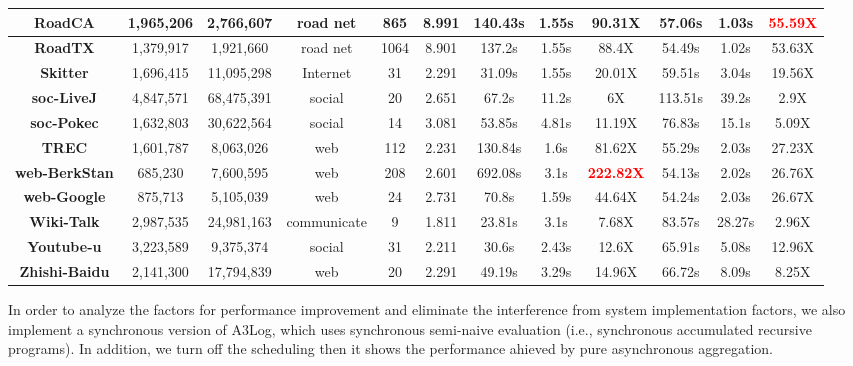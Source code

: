 \begin{table}[!t]
\begin{tabular}{c|c|c|c|c|c|c|c|c|c|c|c}
		\hline
		\textbf{RoadCA} & 1,965,206 & 2,766,607 & road net & 865 & 8.991 & 140.43s & 1.55s & 90.31X & 57.06s & 1.03s & \textcolor{red}{\textbf{55.59X}} \\
		\hline
		\textbf{RoadTX} & 1,379,917 & 1,921,660 & road net & 1064 & 8.901 & 137.2s & 1.55s & 88.4X & 54.49s & 1.02s & 53.63X \\
		\hline
		\textbf{Skitter} & 1,696,415 & 11,095,298 & Internet & 31 & 2.291 & 31.09s & 1.55s & 20.01X & 59.51s & 3.04s & 19.56X \\
		\hline
		\textbf{soc-LiveJ} & 4,847,571 & 68,475,391 & social & 20 & 2.651 & 67.2s & 11.2s & 6X & 113.51s & 39.2s & 2.9X \\
		\hline
		\textbf{soc-Pokec} & 1,632,803 & 30,622,564 & social & 14 & 3.081 & 53.85s & 4.81s & 11.19X & 76.83s & 15.1s & 5.09X \\
		\hline
		\textbf{TREC} & 1,601,787 & 8,063,026 & web & 112 & 2.231 & 130.84s & 1.6s & 81.62X & 55.29s & 2.03s & 27.23X \\
		\hline
		\textbf{\footnotesize{web-BerkStan}} & 685,230 & 7,600,595 & web & 208 & 2.601 & 692.08s & 3.1s & \textcolor{red}{\textbf{222.82X}} & 54.13s & 2.02s & 26.76X \\
		\hline
		\textbf{web-Google} & 875,713 & 5,105,039 & web & 24 & 2.731 & 70.8s & 1.59s & 44.64X & 54.24s & 2.03s & 26.67X \\
		\hline
		\textbf{Wiki-Talk} & 2,987,535 & 24,981,163 & \footnotesize{communicate} & 9 & 1.811 & 23.81s & 3.1s & 7.68X & 83.57s & 28.27s & 2.96X \\
		\hline
		\textbf{Youtube-u} & 3,223,589  & 9,375,374 & social & 31 & 2.211 & 30.6s & 2.43s & 12.6X & 65.91s & 5.08s & 12.96X \\
		\hline
		\textbf{\footnotesize{Zhishi-Baidu}} & 2,141,300 & 17,794,839 & web & 20 & 2.291 & 49.19s & 3.29s & 14.96X & 66.72s & 8.09s & 8.25X\\
		\hline
	\end{tabular}
	\vspace{-0.1in}
\end{table}
In order to analyze the factors for performance improvement and eliminate the interference from system implementation factors, we also implement a synchronous version of A3Log, which uses synchronous semi-naive evaluation (i.e., synchronous accumulated recursive programs). In addition, we turn off the scheduling then it shows the performance ahieved by pure asynchronous aggregation.

